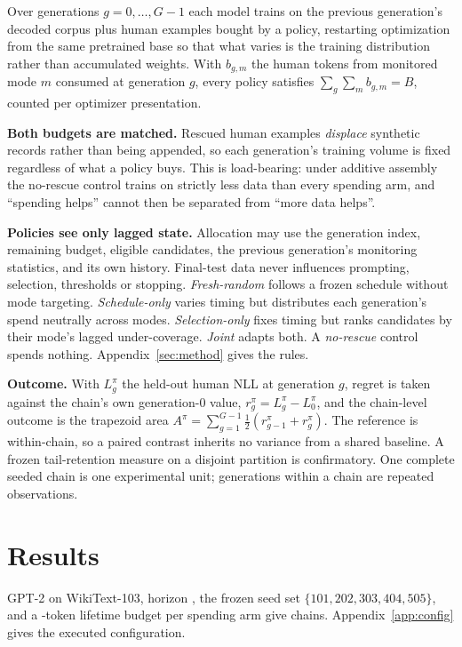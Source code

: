 \documentclass{article}
\begin{document}
Over generations $g=0,\dots,G-1$ each model trains on the previous generation's decoded
corpus plus human examples bought by a policy, restarting optimization from the same
pretrained base so that what varies is the training distribution rather than accumulated
weights. With $b_{g,m}$ the human tokens from monitored mode $m$ consumed at generation
$g$, every policy satisfies $\sum_{g}\sum_{m} b_{g,m}=B$, counted per optimizer
presentation.

\textbf{Both budgets are matched.} Rescued human examples \emph{displace} synthetic records
rather than being appended, so each generation's training volume is fixed regardless of what
a policy buys. This is load-bearing: under additive assembly the no-rescue control trains on
strictly less data than every spending arm, and ``spending helps'' cannot then be separated
from ``more data helps''.

\textbf{Policies see only lagged state.} Allocation may use the generation index, remaining
budget, eligible candidates, the previous generation's monitoring statistics, and its own
history. Final-test data never influences prompting, selection, thresholds or stopping.
\emph{Fresh-random} follows a frozen schedule without mode targeting. \emph{Schedule-only}
varies timing but distributes each generation's spend neutrally across modes.
\emph{Selection-only} fixes timing but ranks candidates by their mode's lagged
under-coverage. \emph{Joint} adapts both. A \emph{no-rescue} control spends nothing.
Appendix~\ref{sec:method} gives the rules.

\textbf{Outcome.} With $L_g^{\pi}$ the held-out human NLL at generation $g$, regret is taken
against the chain's own generation-0 value, $r_g^{\pi}=L_g^{\pi}-L_0^{\pi}$, and the
chain-level outcome is the trapezoid area
$A^{\pi}=\sum_{g=1}^{G-1}\tfrac12(r_{g-1}^{\pi}+r_g^{\pi})$. The reference is within-chain,
so a paired contrast inherits no variance from a shared baseline. A frozen tail-retention
measure on a disjoint partition is confirmatory. One complete seeded chain is one
experimental unit; generations within a chain are repeated observations.

\section{Results}
\label{sec:results}

GPT-2 on WikiText-103, horizon \PilotHorizon{}, the frozen seed set
$\{101,202,303,404,505\}$, and a \PilotCeiling{}-token lifetime budget per spending arm give
\PilotChains{} chains. Appendix~\ref{app:config} gives the executed configuration.
\end{document}
